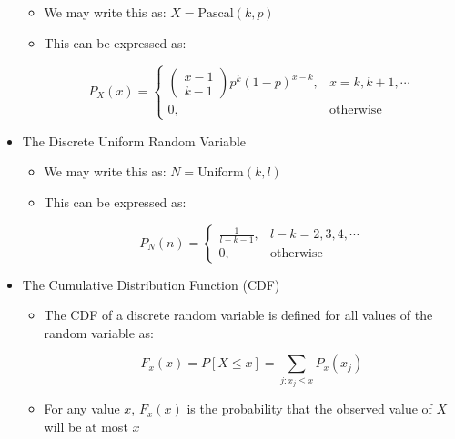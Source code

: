 \begin{itemize}
    \begin{itemize}

      \item We may write this as: $X=\text{Pascal}(k,p)$

      \item This can be expressed as:

        $$P_X(x)=\left\{ \begin{array}{ll} \left( \begin{matrix} x-1\\k-1\end{matrix} \right)p^k(1-p)^{x-k},&x=k,k+1,\cdots\\0,&\text{otherwise}\end{array}$$

    \end{itemize}

  \item The Discrete Uniform Random Variable

    \begin{itemize}

      \item We may write this as: $N=\text{Uniform}(k,l)$

      \item This can be expressed as:

        $$P_N(n)=\left\{ \begin{array}{ll} \frac{1}{l-k-1},&l-k=2,3,4,\cdots\\0,&\text{otherwise}\end{array}$$

    \end{itemize}

  \item The Cumulative Distribution Function (CDF)

    \begin{itemize}

      \item The CDF of a discrete random variable is defined for all values of the random variable as:

        $$F_x(x)=P[X\leq x]=\sum_{j:x_j\leq x}P_x(x_j)$$

      \item For any value $x$, $F_x(x)$ is the probability that the observed value of $X$ will be at most $x$

    \end{itemize}

\end{itemize}



